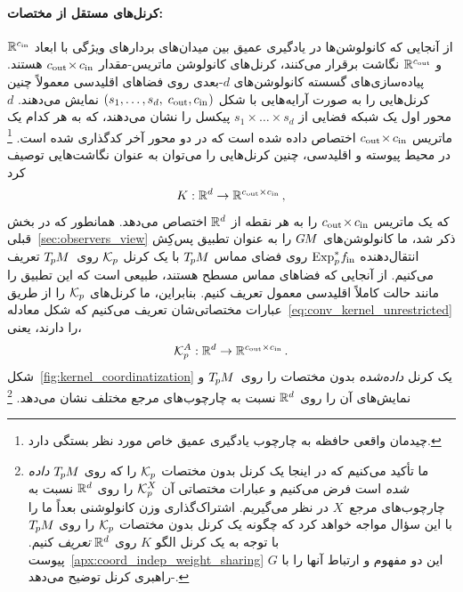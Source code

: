 \paragraph{کرنل‌های مستقل از مختصات:}
از آنجایی که کانولوشن‌ها در یادگیری عمیق بین میدان‌های بردارهای ویژگی با ابعاد $\mathbb{R}^{c_\textup{in}}$ و $\mathbb{R}^{c_\textup{out}}$ نگاشت برقرار می‌کنند، کرنل‌های کانولوشن ماتریس-مقدار ${{c_\textup{out}} \mkern-3mu\times\mkern-1.5mu {c_\textup{in}}}$ هستند.
پیاده‌سازی‌های گسسته کانولوشن‌های $d$-بعدی روی فضاهای اقلیدسی معمولاً چنین کرنل‌هایی را به صورت آرایه‌هایی با شکل $(s_1,\dots,s_d, \; c_\text{out},c_\text{in} \mkern1mu)$ نمایش می‌دهند.
$d$ محور اول یک شبکه فضایی از $s_1 \times\dots\times s_d$ پیکسل را نشان می‌دهند، که به هر کدام یک ماتریس ${{c_\textup{out}} \mkern-3mu\times\mkern-1.5mu {c_\textup{in}}}$ اختصاص داده شده است که در دو محور آخر کدگذاری شده است.%
\footnote{
	چیدمان واقعی حافظه به چارچوب یادگیری عمیق خاص مورد نظر بستگی دارد.
}
در محیط پیوسته و اقلیدسی، چنین کرنل‌هایی را می‌توان به عنوان نگاشت‌هایی توصیف کرد
\begin{align}\label{eq:conv_kernel_unrestricted}
	K: \mathbb{R}^d \to \mathbb{R}^{{c_\textup{out}}\times{c_\textup{in}}} \,,
\end{align}
که یک ماتریس ${{c_\textup{out}} \mkern-3mu\times\mkern-1.5mu {c_\textup{in}}}$ را به هر نقطه از $\mathbb{R}^d$ اختصاص می‌دهد.
همانطور که در بخش قبلی~\ref{sec:observers_view} ذکر شد، ما کانولوشن‌های $G\mkern-1.4muM$ را به عنوان تطبیق پس‌کِش انتقال‌دهنده $\operatorname{Exp}^*_p\mkern-2mu f_\textup{\;\!\!in}$
روی فضای مماس $T_{\mkern-1.5mu p}\mkern-.5muM$ با یک کرنل $\mathcal{K}_p$ روی~$T_{\mkern-1.5mu p}\mkern-.5muM$ تعریف می‌کنیم.
از آنجایی که فضاهای مماس مسطح هستند، طبیعی است که این تطبیق را مانند حالت کاملاً اقلیدسی معمول تعریف کنیم.
بنابراین، ما کرنل‌های $\mathcal{K}_p$ را از طریق عبارات مختصاتی‌شان تعریف می‌کنیم که شکل معادله~\eqref{eq:conv_kernel_unrestricted} را دارند، یعنی،
\begin{align}
	\mathcal{K}_p^A: \mathbb{R}^d \to \mathbb{R}^{{c_\textup{out}}\times{c_\textup{in}}} \,.
\end{align}
شکل~\ref{fig:kernel_coordinatization} یک کرنل \emph{داده‌شده} بدون مختصات را روی~$T_{\mkern-1.5mu p}\mkern-.5muM$ و نمایش‌های آن را روی $\mathbb{R}^d$ نسبت به چارچوب‌های مرجع مختلف نشان می‌دهد.%
\footnote{
	ما تأکید می‌کنیم که در اینجا یک کرنل بدون مختصات $\mathcal{K}_p$ را که روی $T_{\mkern-1.5mu p}\mkern-.5muM$ \emph{داده شده} است فرض می‌کنیم و عبارات مختصاتی آن $\mathcal{K}_p^X$ را روی $\mathbb{R}^d$ نسبت به چارچوب‌های مرجع~$X$ در نظر می‌گیریم.
	اشتراک‌گذاری وزن کانولوشنی بعداً ما را با این سؤال مواجه خواهد کرد که چگونه یک کرنل بدون مختصات $\mathcal{K}_p$ را روی $T_{\mkern-1.5mu p}\mkern-.5muM$ با توجه به یک کرنل الگو $K$ روی $\mathbb{R}^d$ \emph{تعریف} کنیم.
	پیوست~\ref{apx:coord_indep_weight_sharing} این دو مفهوم و ارتباط آنها را با $G$-راهبری کرنل توضیح می‌دهد.
}


